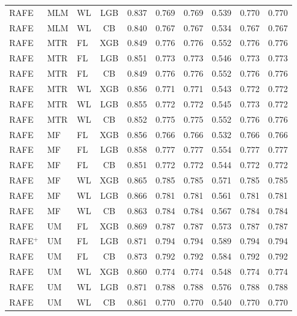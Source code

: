 \documentclass[9pt,a4paper]{article}
\begin{document}
\begin{scriptsize}
\begin{longtable}{lllcrrrrrr}
RAFE & MLM & WL & LGB & 0.837 & 0.769 & 0.769 & 0.539 & 0.770 & 0.770 \\
RAFE & MLM & WL & CB  & 0.840 & 0.767 & 0.767 & 0.534 & 0.767 & 0.767 \\
RAFE & MTR & FL & XGB & 0.849 & 0.776 & 0.776 & 0.552 & 0.776 & 0.776 \\
RAFE & MTR & FL & LGB & 0.851 & 0.773 & 0.773 & 0.546 & 0.773 & 0.773 \\
RAFE & MTR & FL & CB  & 0.849 & 0.776 & 0.776 & 0.552 & 0.776 & 0.776 \\
RAFE & MTR & WL & XGB & 0.856 & 0.771 & 0.771 & 0.543 & 0.772 & 0.772 \\
RAFE & MTR & WL & LGB & 0.855 & 0.772 & 0.772 & 0.545 & 0.773 & 0.772 \\
RAFE & MTR & WL & CB  & 0.852 & 0.775 & 0.775 & 0.552 & 0.776 & 0.776 \\
RAFE & MF  & FL & XGB & 0.856 & 0.766 & 0.766 & 0.532 & 0.766 & 0.766 \\
RAFE & MF  & FL & LGB & 0.858 & 0.777 & 0.777 & 0.554 & 0.777 & 0.777 \\
RAFE & MF  & FL & CB  & 0.851 & 0.772 & 0.772 & 0.544 & 0.772 & 0.772 \\
RAFE & MF  & WL & XGB & 0.865 & 0.785 & 0.785 & 0.571 & 0.785 & 0.785 \\
RAFE & MF  & WL & LGB & 0.866 & 0.781 & 0.781 & 0.561 & 0.781 & 0.781 \\
RAFE & MF  & WL & CB  & 0.863 & 0.784 & 0.784 & 0.567 & 0.784 & 0.784 \\
RAFE & UM  & FL & XGB & 0.869 & 0.787 & 0.787 & 0.573 & 0.787 & 0.787 \\
RAFE$^+$ & UM & FL & LGB & 0.871 & 0.794 & 0.794 & 0.589 & 0.794 & 0.794 \\
RAFE & UM  & FL & CB  & 0.873 & 0.792 & 0.792 & 0.584 & 0.792 & 0.792 \\
RAFE & UM  & WL & XGB & 0.860 & 0.774 & 0.774 & 0.548 & 0.774 & 0.774 \\
RAFE & UM  & WL & LGB & 0.871 & 0.788 & 0.788 & 0.576 & 0.788 & 0.788 \\
RAFE & UM  & WL & CB  & 0.861 & 0.770 & 0.770 & 0.540 & 0.770 & 0.770 \\
\end{longtable}
\end{scriptsize}

\newpage

\end{document}

